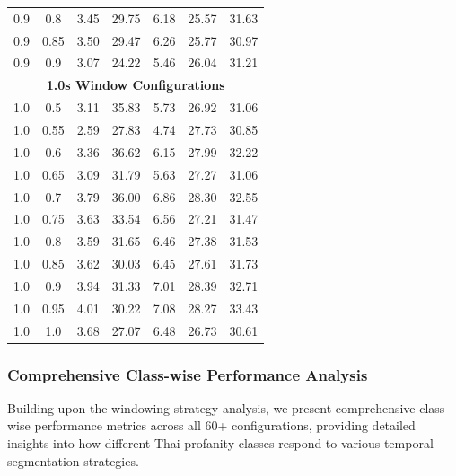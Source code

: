 \documentclass[11pt]{article}
\begin{document}
\begin{table}[H]
\begin{tabular}{|c|c|c|c|c|c|c|}
        0.9 & 0.8 & 3.45 & 29.75 & 6.18 & 25.57 & 31.63 \\
        0.9 & 0.85 & 3.50 & 29.47 & 6.26 & 25.77 & 30.97 \\
        0.9 & 0.9 & 3.07 & 24.22 & 5.46 & 26.04 & 31.21 \\
        \hline
        \multicolumn{7}{|c|}{\textbf{1.0s Window Configurations}} \\
        \hline
        1.0 & 0.5 & 3.11 & 35.83 & 5.73 & 26.92 & 31.06 \\
        1.0 & 0.55 & 2.59 & 27.83 & 4.74 & 27.73 & 30.85 \\
        1.0 & 0.6 & 3.36 & 36.62 & 6.15 & 27.99 & 32.22 \\
        1.0 & 0.65 & 3.09 & 31.79 & 5.63 & 27.27 & 31.06 \\
        1.0 & 0.7 & 3.79 & 36.00 & 6.86 & 28.30 & 32.55 \\
        1.0 & 0.75 & 3.63 & 33.54 & 6.56 & 27.21 & 31.47 \\
        1.0 & 0.8 & 3.59 & 31.65 & 6.46 & 27.38 & 31.53 \\
        1.0 & 0.85 & 3.62 & 30.03 & 6.45 & 27.61 & 31.73 \\
        1.0 & 0.9 & 3.94 & 31.33 & 7.01 & 28.39 & 32.71 \\
        1.0 & 0.95 & 4.01 & 30.22 & 7.08 & 28.27 & 33.43 \\
        1.0 & 1.0 & 3.68 & 27.07 & 6.48 & 26.73 & 30.61 \\
        \hline
    \end{tabular}
\end{table}

\subsubsection{Comprehensive Class-wise Performance Analysis}
Building upon the windowing strategy analysis, we present comprehensive class-wise performance metrics across all 60+ configurations, providing detailed insights into how different Thai profanity classes respond to various temporal segmentation strategies.
\end{document}
